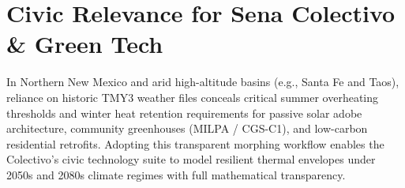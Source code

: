 \documentclass[10pt,a4paper]{article}
\begin{document}
\section{Civic Relevance for Sena Colectivo \& Green Tech}
In Northern New Mexico and arid high-altitude basins (e.g., Santa Fe and Taos), reliance on historic TMY3 weather files conceals critical summer overheating thresholds and winter heat retention requirements for passive solar adobe architecture, community greenhouses (MILPA / CGS-C1), and low-carbon residential retrofits. Adopting this transparent morphing workflow enables the Colectivo's civic technology suite to model resilient thermal envelopes under 2050s and 2080s climate regimes with full mathematical transparency.



\end{document}
